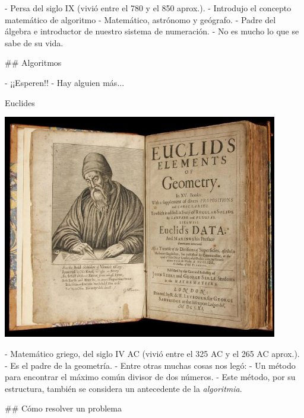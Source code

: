 - Persa del siglo IX (vivió entre el 780 y el 850 aprox.).
- Introdujo el concepto matemático de algoritmo
- Matemático, astrónomo y geógrafo. 
- Padre del álgebra e introductor de nuestro sistema de numeración.
- No es mucho lo que se sabe de su vida.

## Algoritmos

\bgncolumns
{}
\vspace{-1em}

- ¡¡Esperen!!
- Hay alguien más...

\pause

\bgnblockgood[wd=.8\textwidth]
Euclides
\trmblockgood

\includegraphics[width=0.9\textwidth,valign=t]{img/euclid-elements.jpg}
\trmcolumns

- Matemático griego, del siglo IV AC (vivió entre el 325 AC y el 265 AC aprox.).
- Es el padre de la geometría.
- Entre otras muchas cosas nos legó:
    - Un método para encontrar el máximo común divisor de dos números.
    - Este método, por su estructura, también se considera un antecedente de la \textit{algoritmia}.


## Cómo resolver un problema

\vspace{1em}
\begin{small}
\end{small}


